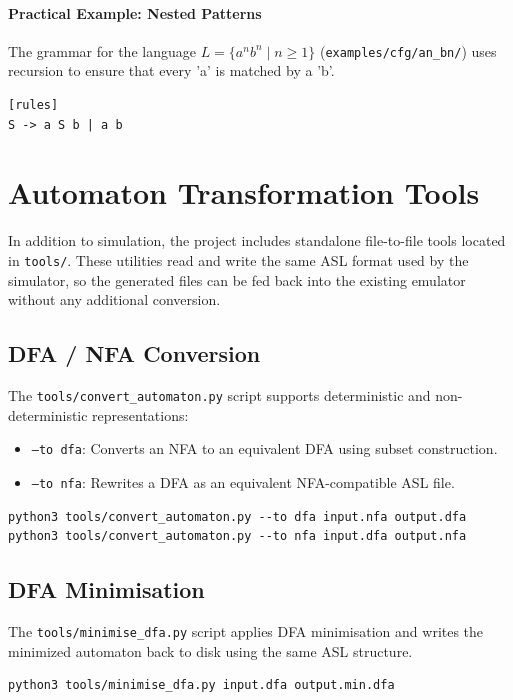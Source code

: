 \documentclass{article}
\begin{document}
\paragraph{Practical Example: Nested Patterns}
The grammar for the language $L = \{a^n b^n \mid n \ge 1\}$ (\texttt{examples/cfg/an\_bn/}) uses recursion to ensure that every 'a' is matched by a 'b'.
\begin{lstlisting}[caption={CFG for $a^n b^n$}]
[rules]
S -> a S b | a b
\end{lstlisting}

\clearpage
\section{Automaton Transformation Tools}
In addition to simulation, the project includes standalone file-to-file tools located in \texttt{tools/}. These utilities read and write the same ASL format used by the simulator, so the generated files can be fed back into the existing emulator without any additional conversion.

\subsection{DFA / NFA Conversion}
The \texttt{tools/convert\_automaton.py} script supports deterministic and non-deterministic representations:
\begin{itemize}
    \item \texttt{--to dfa}: Converts an NFA to an equivalent DFA using subset construction.
    \item \texttt{--to nfa}: Rewrites a DFA as an equivalent NFA-compatible ASL file.
\end{itemize}

\begin{lstlisting}
python3 tools/convert_automaton.py --to dfa input.nfa output.dfa
python3 tools/convert_automaton.py --to nfa input.dfa output.nfa
\end{lstlisting}

\subsection{DFA Minimisation}
The \texttt{tools/minimise\_dfa.py} script applies DFA minimisation and writes the minimized automaton back to disk using the same ASL structure.
\begin{lstlisting}
python3 tools/minimise_dfa.py input.dfa output.min.dfa
\end{lstlisting}
\end{document}
